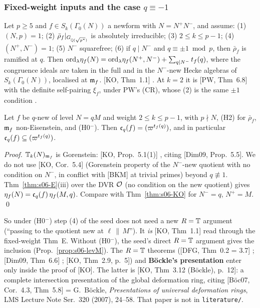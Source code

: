 \subsubsection{Fixed-weight inputs and the case $q\equiv-1$}
\begin{theorem}\label{thm:s06-KO}
Let $p\ge5$ and $f\in S_k(\Gamma_0(N))$ a newform with $N=N^+N^-$, and assume: (1) $(N,p)=1$; (2) $\bar\rho_f|_{G_{\mathbb{Q}(\sqrt{p^*})}}$
is absolutely irreducible; (3) $2\le k\le p-1$; (4) $(N^+,N^-)=1$; (5) $N^-$ squarefree; (6) if $q\mid N^-$ and $q\equiv\pm1\bmod p$,
then $\bar\rho_f$ is ramified at $q$. Then $\mathrm{ord}_\lambda\eta_f(N)=\mathrm{ord}_\lambda\eta_f(N^+,N^-)+\sum_{q\mid N^-}t_f(q)$, where the
congruence ideals are taken in the full and in the $N^-$-new Hecke algebras of $S_k(\Gamma_0(N))$, localised at $\mathfrak{m}_f$.
\stcited{} [KO, Thm~1.1] . At $k=2$ it is [PW, Thm~6.8]
 with the definite self-pairing $\xi_f$, under PW's (CR), whose (2) is the same $\pm1$
condition .
\end{theorem}

\begin{corollary}\label{cor:s06-fixed}
Let $f$ be $q$-new of level $N=qM$ and weight $2\le k\le p-1$, with $p\nmid N$, (H2) for $\bar\rho_f$, $\mathfrak{m}_f$ non-Eisenstein, and
(H0$^-$). Then $\mathfrak{c}_q(f)=(\varpi^{t_f(q)})$, and in particular $\mathfrak{c}_q(f)\subseteq(\varpi^{t_f(q)})$. \stpmc{}
\end{corollary}
\noindent\emph{Proof.} $\mathbb{T}_k(N)_{\mathfrak{m}_f}$ is Gorenstein: [KO, Prop.~5.1(1)] , citing
[Dim09, Prop.~5.5]. We do not use [KO, Cor.~5.4] (Gorenstein property of the $N^-$-new quotient with no condition on $N^-$, in
conflict with [BKM] at trivial primes) beyond $q\not\equiv1$.
Thm~\ref{thm:s06-E}(iii) over the DVR $\mathcal{O}$ (no condition on the new quotient) gives
$\eta_f(N)=\mathfrak{c}_q(f)\,\eta_f(M,q)$. Compare with Thm~\ref{thm:s06-KO} for $N^-=q$, $N^+=M$. \qed

\noindent So under (H0$^-$) step (4) of the seed does not need a new $R=\mathbb{T}$ argument (``passing to the quotient new at $\ell\,\|\,M$''). It
\emph{is} [KO, Thm~1.1] read through the fixed-weight Thm~E. Without (H0$^-$), the seed's direct $R=\mathbb{T}$ argument gives the inclusion
(Prop.~\ref{prop:s06-levM}).  The $R=\mathbb{T}$ theorems ([DFG, Thm~0.2 = 3.7]
; [Dim09, Thm~6.6]
; [KO, Thm~2.9, p.~5]) and
\textbf{Böckle's presentation} enter only inside the proof of [KO]. The latter is [KO, Thm~3.12 (Böckle), p.~12]: a complete
intersection presentation of the global deformation ring, citing [Böc07, Cor.~4.3, Thm~5.8] = G.~Böckle, \emph{Presentations of
universal deformation rings}, LMS Lecture Note Ser.\ 320 (2007), 24--58. That paper is not in \texttt{literature/}.

